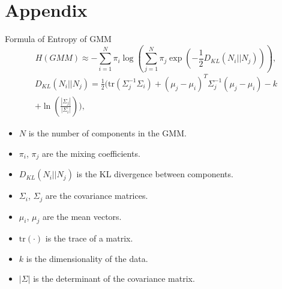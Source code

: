 \documentclass[pdf]{beamer}
\begin{document}
\section{Appendix}
\begin{frame}{Formula of Entropy of GMM}
\begin{equation*}
    H(GMM) \approx -\sum_{i=1}^{N} \pi_i \log \left(\sum_{j=1}^{N} \pi_j \exp\left(-\frac{1}{2} D_{KL}(N_i || N_j)\right)\right),
\end{equation*}
\begin{equation*}
    \begin{split}
    D_{KL}(N_i || N_j) = \frac{1}{2} \bigg( \text{tr}(\Sigma_j^{-1}\Sigma_i) + (\mu_j - \mu_i)^T \Sigma_j^{-1} (\mu_j - \mu_i) - k \\
    + \ln\left(\frac{|\Sigma_j|}{|\Sigma_i|}\right) \bigg),
\end{split}
\end{equation*}

\begin{itemize}
    \item \(N\) is the number of components in the GMM.
    \item \(\pi_i\), \(\pi_j\) are the mixing coefficients.
    \item \(D_{KL}(N_i || N_j)\) is the KL divergence between components.
    \item \(\Sigma_i\), \(\Sigma_j\) are the covariance matrices.
    \item \(\mu_i\), \(\mu_j\) are the mean vectors.
    \item \(\text{tr}(\cdot)\) is the trace of a matrix.
    \item \(k\) is the dimensionality of the data.
    \item \(|\Sigma|\) is the determinant of the covariance matrix.
\end{itemize}
\end{frame}
\end{document}
